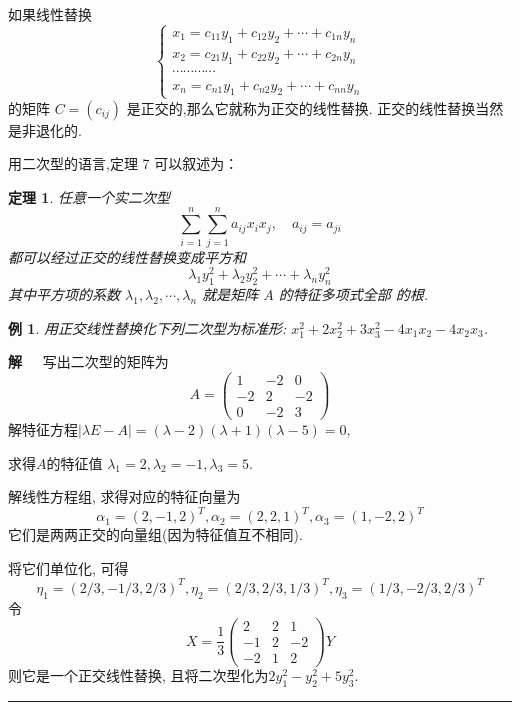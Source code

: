 \documentclass[13pt]{beamer}
\newtheorem{thm}{定理}
\newtheorem{exa}{例}
\def\qed{\nopagebreak\hfill{\rule{4pt}{7pt}}\medbreak}
\def\sol{{\bf 解~~ }}
\begin{document}
\begin{frame}
\small{如果线性替换
\[
\left\{\begin{array}{l}
x_{1}=c_{11} y_{1}+c_{12} y_{2}+\cdots+c_{1 n} y_{n} \\
x_{2}=c_{21} y_{1}+c_{22} y_{2}+\cdots+c_{2 n} y_{n} \\
\cdots \cdots \cdots \cdots \\
x_{n}=c_{n 1} y_{1}+c_{n 2} y_{2}+\cdots+c_{n n} y_{n}
\end{array}\right.
\]
的矩阵 ${C}=\left(c_{i j}\right)$ 是正交的,那么它就称为正交的线性替换.
正交的线性替换当然是非退化的. 

用二次型的语言,定理 7 可以叙述为： 
\begin{thm}
任意一个实二次型
\[
\sum_{i=1}^{n} \sum_{j=1}^{n} a_{i j} x_{i} x_{j},  \quad  a_{i j}=a_{j i}
\]
都可以经过正交的线性替换变成平方和
\[
\lambda_{1} y_{1}^{2}+\lambda_{2} y_{2}^{2}+\cdots+\lambda_{n} y_{n}^{2}
\]
其中平方项的系数 $\lambda_{1}, \lambda_{2}, \cdots, \lambda_{n}$ 就是矩阵 ${A}$ 的特征多项式全部 的根. 
\end{thm}
}
\end{frame}

\begin{frame}
\begin{exa}
用正交线性替换化下列二次型为标准形:
$ x_{1}^{2}+2 x_{2}^{2}+3 x_{3}^{2}-4 x_{1} x_{2}-4 x_{2} x_{3}$.
\end{exa}

\sol 写出二次型的矩阵为
\[
A=\left(\begin{array}{ccc}
1 & -2 & 0 \\
-2 & 2 & -2 \\
0 & -2 & 3
\end{array}\right)
\]
解特征方程$|\lambda E - A |=(\lambda-2)(\lambda+1)(\lambda-5)=0,$ 

求得$A$的特征值 $\lambda_{1}=2, \lambda_{2}=-1, \lambda_{3}=5 .$ 

解线性方程组, 求得对应的特征向量为
\[
\alpha_{1}=(2,-1,2)^{T}, \alpha_{2}=(2,2,1)^{T}, \alpha_{3}=(1,-2,2)^{T}
\]
它们是两两正交的向量组(因为特征值互不相同). 
\end{frame}

\begin{frame}
将它们单位化, 可得
\[
\eta_{1}=(2 / 3,-1 / 3,2 / 3)^{T}, \eta_{2}=(2 / 3,2 / 3,1 / 3)^{T}, \eta_{3}=(1 / 3,-2 / 3,2 / 3)^{T}
\]
令
\[
X=\frac{1}{3}\left(\begin{array}{ccc}
2 & 2 & 1 \\
-1 & 2 & -2 \\
-2 & 1 & 2
\end{array}\right) Y
\]
则它是一个正交线性替换, 且将二次型化为$2 y_{1}^{2}-y_{2}^{2}+5 y_{3}^{2}$.
\qed
\end{frame}
\end{document}
